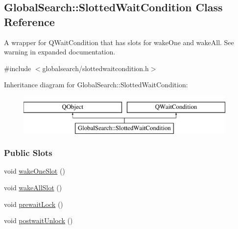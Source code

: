 \hypertarget{classGlobalSearch_1_1SlottedWaitCondition}{}\subsection{Global\+Search\+:\+:Slotted\+Wait\+Condition Class Reference}
\label{classGlobalSearch_1_1SlottedWaitCondition}


A wrapper for Q\+Wait\+Condition that has slots for wake\+One and wake\+All. See warning in expanded documentation.  




{\ttfamily \#include $<$globalsearch/slottedwaitcondition.\+h$>$}

Inheritance diagram for Global\+Search\+:\+:Slotted\+Wait\+Condition\+:\begin{figure}[H]
\begin{center}
\leavevmode
\includegraphics[height=2.000000cm]{classGlobalSearch_1_1SlottedWaitCondition}
\end{center}
\end{figure}
\subsubsection*{Public Slots}
\begin{DoxyCompactItemize}
\item 
void \hyperlink{classGlobalSearch_1_1SlottedWaitCondition_a26b060dde9c49345da5fe1c8dbd3374c}{wake\+One\+Slot} ()
\item 
void \hyperlink{classGlobalSearch_1_1SlottedWaitCondition_a4024066fe5db52f2e2c9257fcfbb5320}{wake\+All\+Slot} ()
\item 
void \hyperlink{classGlobalSearch_1_1SlottedWaitCondition_afb1ba4315ffa2de59eaf5045d2a4c09f}{prewait\+Lock} ()
\item 
void \hyperlink{classGlobalSearch_1_1SlottedWaitCondition_a3c9f9e3ba7eebdc3cc270445385e334c}{postwait\+Unlock} ()
\end{DoxyCompactItemize}
